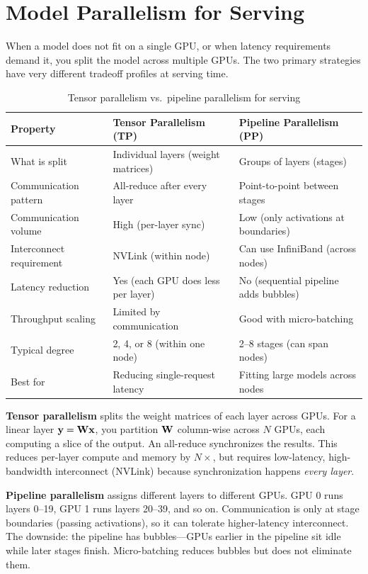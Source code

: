 \section{Model Parallelism for Serving}
\label{sec:serving_parallelism}

When a model does not fit on a single GPU, or when latency requirements demand it, you split the model across multiple GPUs. The two primary strategies have very different tradeoff profiles at serving time.

\begin{table}[H]
\centering
\caption{Tensor parallelism vs.\ pipeline parallelism for serving}
\begin{tabularx}{\textwidth}{lXX}
\toprule
\textbf{Property} & \textbf{Tensor Parallelism (TP)} & \textbf{Pipeline Parallelism (PP)} \\
\midrule
What is split & Individual layers (weight matrices) & Groups of layers (stages) \\
Communication pattern & All-reduce after every layer & Point-to-point between stages \\
Communication volume & High (per-layer sync) & Low (only activations at boundaries) \\
Interconnect requirement & NVLink (within node) & Can use InfiniBand (across nodes) \\
Latency reduction & Yes (each GPU does less per layer) & No (sequential pipeline adds bubbles) \\
Throughput scaling & Limited by communication & Good with micro-batching \\
Typical degree & 2, 4, or 8 (within one node) & 2--8 stages (can span nodes) \\
Best for & Reducing single-request latency & Fitting large models across nodes \\
\bottomrule
\end{tabularx}
\end{table}

\textbf{Tensor parallelism} splits the weight matrices of each layer across GPUs. For a linear layer $\mathbf{y} = \mathbf{W}\mathbf{x}$, you partition $\mathbf{W}$ column-wise across $N$ GPUs, each computing a slice of the output. An all-reduce synchronizes the results. This reduces per-layer compute and memory by $N\times$, but requires low-latency, high-bandwidth interconnect (NVLink) because synchronization happens \textit{every layer}.

\textbf{Pipeline parallelism} assigns different layers to different GPUs. GPU 0 runs layers 0--19, GPU 1 runs layers 20--39, and so on. Communication is only at stage boundaries (passing activations), so it can tolerate higher-latency interconnect. The downside: the pipeline has bubbles---GPUs earlier in the pipeline sit idle while later stages finish. Micro-batching reduces bubbles but does not eliminate them.

